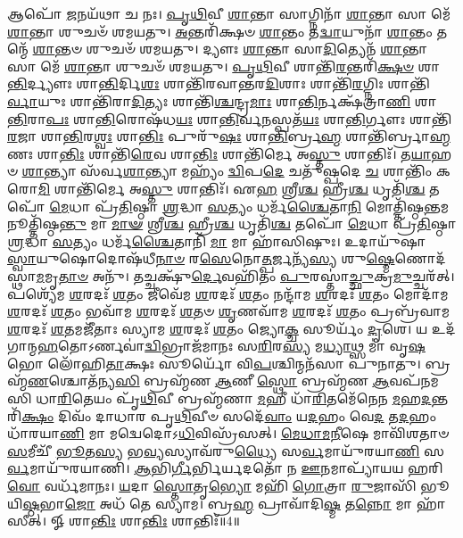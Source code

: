 𑌆𑌪𑍋᳴ \ul{𑌜}\-𑌨𑌯᳴𑌥𑌾 𑌚 𑌨𑌃। \ul{𑌪𑍃}\-\-\ul{𑌥𑌿}\-𑌵𑍀 \ul{𑌶𑌾}\-𑌨𑍍𑌤𑌾 𑌸𑌾𑌗𑍍𑌨𑌿𑌨𑌾᳴ \ul{𑌶𑌾}\-𑌨𑍍𑌤𑌾 𑌸𑌾 𑌮𑍇᳴ \ul{𑌶𑌾}\-𑌨𑍍𑌤𑌾 𑌶𑍁𑌚𑍞᳴ 𑌶𑌮𑌯𑌤𑍁। \ul{𑌅}\-𑌨𑍍𑌤𑌰𑌿᳴𑌕𑍍𑌷𑍞 \ul{𑌶𑌾}\-𑌨𑍍𑌤𑌂 𑌤\-\ul{𑌦𑍍𑌵𑌾}\-𑌯𑍁𑌨𑌾᳴ \ul{𑌶𑌾}\-𑌨𑍍𑌤𑌂 𑌤𑌨𑍍𑌮𑍇᳴ \ul{𑌶𑌾}\-𑌨𑍍𑌤𑍞 𑌶𑍁𑌚𑍞᳴ 𑌶𑌮𑌯𑌤𑍁। 𑌦𑍍𑌯𑍗𑌃  \ul{𑌶𑌾}\-𑌨𑍍𑌤𑌾 𑌸𑌾\-\ul{𑌦𑌿}\-𑌤𑍍𑌯𑍇𑌨᳴ \ul{𑌶𑌾}\-𑌨𑍍𑌤𑌾 𑌸𑌾 𑌮𑍇᳴ \ul{𑌶𑌾}\-𑌨𑍍𑌤𑌾 𑌶𑍁𑌚𑍞᳴ 𑌶𑌮𑌯𑌤𑍁। \ul{𑌪𑍃}\-\-\ul{𑌥𑌿}\-𑌵𑍀 𑌶𑌾𑌨𑍍𑌤𑌿᳴\-\ul{𑌰}\-𑌨𑍍𑌤𑌰𑌿᳴\-\ul{𑌕𑍍𑌷}\-\-\ul{𑍞} 𑌶𑌾\-\ul{𑌨𑍍𑌤𑌿}\-𑌰𑍍𑌦𑍍𑌯𑍗𑌃  𑌶𑌾\-\ul{𑌨𑍍𑌤𑌿}\-𑌰𑍍𑌦𑌿\-\ul{𑌶𑌃} 𑌶𑌾𑌨𑍍𑌤𑌿᳴𑌰𑌵𑌾𑌨𑍍𑌤𑌰\-\ul{𑌦𑌿}\-𑌶𑌾𑌃  𑌶𑌾𑌨𑍍𑌤𑌿᳴\-\ul{𑌰}\-𑌗𑍍𑌨𑌿𑌃  𑌶𑌾𑌨𑍍𑌤𑌿᳴\-\ul{𑌰𑍍𑌵𑌾}\-𑌯𑍁𑌃  𑌶𑌾𑌨𑍍𑌤𑌿᳴𑌰𑌾\-\ul{𑌦𑌿}\-𑌤𑍍𑌯𑌃  𑌶𑌾𑌨𑍍𑌤𑌿᳴\-\ul{𑌶𑍍𑌚}\-𑌨𑍍𑌦𑍍𑌰\-\ul{𑌮𑌾𑌃} 𑌶𑌾\-\ul{𑌨𑍍𑌤𑌿}\-𑌰𑍍𑌨𑌕𑍍𑌷᳴𑌤𑍍𑌰𑌾\-\ul{𑌣𑌿} 𑌶𑌾\-\ul{𑌨𑍍𑌤𑌿}\-𑌰𑌾\-\ul{𑌪𑌃} 𑌶𑌾\-\ul{𑌨𑍍𑌤𑌿}\-𑌰𑍋𑌷᳴𑌧\-\ul{𑌯𑌃} 𑌶𑌾\-\ul{𑌨𑍍𑌤𑌿}\-𑌰𑍍𑌵\-\ul{𑌨}\-𑌸𑍍𑌪𑌤᳴\-\ul{𑌯𑌃} 𑌶𑌾\-\ul{𑌨𑍍𑌤𑌿}\-𑌰𑍍𑌗𑍗𑌃  𑌶𑌾𑌨𑍍𑌤𑌿᳴\-\ul{𑌰}\-𑌜𑌾 𑌶𑌾\-\ul{𑌨𑍍𑌤𑌿}\-𑌰\-\ul{𑌶𑍍𑌵𑌃} 𑌶𑌾\-\ul{𑌨𑍍𑌤𑌿𑌃} 𑌪𑍁𑌰𑍁᳴\-\ul{𑌷𑌃} 𑌶𑌾\-\ul{𑌨𑍍𑌤𑌿}\-𑌰𑍍𑌬𑍍𑌰\-\ul{𑌹𑍍𑌮} 𑌶𑌾𑌨𑍍𑌤𑌿᳴𑌰𑍍𑌬𑍍𑌰𑌾\-\ul{𑌹𑍍𑌮}\-𑌣𑌃  𑌶𑌾\-\ul{𑌨𑍍𑌤𑌿𑌃} 𑌶𑌾𑌨𑍍𑌤𑌿᳴\-\ul{𑌰𑍇}\-𑌵 𑌶𑌾\-\ul{𑌨𑍍𑌤𑌿𑌃} 𑌶𑌾𑌨𑍍𑌤𑌿᳴𑌰𑍍𑌮𑍇 𑌅\-\ul{𑌸𑍍𑌤𑍁} 𑌶𑌾𑌨𑍍𑌤𑌿𑌃᳴। 𑌤\-\ul{𑌯𑌾}\-𑌹𑍞 \ul{𑌶𑌾}\-𑌨𑍍𑌤𑍍𑌯𑌾 𑌸᳴𑌰𑍍𑌵\-\ul{𑌶𑌾}\-𑌨𑍍𑌤𑍍𑌯𑌾 𑌮𑌹𑍍𑌯𑌂᳴ \ul{𑌦𑍍𑌵𑌿}\-𑌪\-\ul{𑌦𑍇} 𑌚𑌤𑍁᳴𑌷𑍍𑌪𑌦𑍇 \ul{𑌚} 𑌶𑌾𑌨𑍍𑌤𑌿𑌂᳴ 𑌕𑌰𑍋\-\ul{𑌮𑌿} 𑌶𑌾𑌨𑍍𑌤𑌿᳴𑌰𑍍𑌮𑍇 𑌅\-\ul{𑌸𑍍𑌤𑍁} 𑌶𑌾𑌨𑍍𑌤𑌿𑌃᳴। 𑌏\-\ul{𑌹} 𑌶𑍍𑌰𑍀\-\ul{𑌶𑍍𑌚} 𑌹𑍍𑌰𑍀\-\ul{𑌶𑍍𑌚} 𑌧𑍃𑌤𑌿᳴\-\ul{𑌶𑍍𑌚} 𑌤𑌪𑍋᳴ \ul{𑌮𑍇}\-𑌧𑌾 𑌪𑍍𑌰᳴\-\ul{𑌤𑌿}\-𑌷𑍍𑌠𑌾 \ul{𑌶𑍍𑌰}\-𑌦𑍍𑌧𑌾 \ul{𑌸}\-𑌤𑍍𑌯𑌂 𑌧𑌰𑍍𑌮᳴\-\ul{𑌶𑍍𑌚𑍈}\-𑌤𑌾\-\ul{𑌨𑌿} 𑌮𑍋𑌤𑍍𑌤𑌿᳴𑌷𑍍𑌠\-\ul{𑌨𑍍𑌤}\-𑌮𑌨𑍂𑌤𑍍𑌤𑌿᳴𑌷𑍍𑌠\-\ul{𑌨𑍍𑌤𑍁} 𑌮𑌾 \ul{𑌮𑌾}\-\-\ul{𑍟} 𑌶𑍍𑌰𑍀\-\ul{𑌶𑍍𑌚} 𑌹𑍍𑌰𑍀\-\ul{𑌶𑍍𑌚} 𑌧𑍃𑌤𑌿᳴\-\ul{𑌶𑍍𑌚} 𑌤𑌪𑍋᳴ \ul{𑌮𑍇}\-𑌧𑌾 𑌪𑍍𑌰᳴\-\ul{𑌤𑌿}\-𑌷𑍍𑌠𑌾 \ul{𑌶𑍍𑌰}\-𑌦𑍍𑌧𑌾 \ul{𑌸}\-𑌤𑍍𑌯𑌂 𑌧𑌰𑍍𑌮᳴\-\ul{𑌶𑍍𑌚𑍈}\-𑌤𑌾𑌨𑌿᳴ \ul{𑌮𑌾} 𑌮𑌾 𑌹𑌾᳴𑌸𑌿𑌷𑍁𑌃। 𑌉𑌦𑌾𑌯𑍁᳴𑌷𑌾 \ul{𑌸𑍍𑌵𑌾}\-𑌯𑍁𑌷𑍋𑌦𑍋𑌷᳴𑌧𑍀\-\ul{𑌨𑌾}\-\-\ul{𑍞} 𑌰\-\ul{𑌸𑍇}\-𑌨𑍋\-\ul{𑌤𑍍𑌪}\-𑌰𑍍𑌜𑌨𑍍𑌯᳴\-\ul{𑌸𑍍𑌯} 𑌶𑍁\-\ul{𑌷𑍍𑌮𑍇}\-𑌣𑍋𑌦᳴𑌸𑍍𑌥𑌾\-\ul{𑌮}\-𑌮𑍃\-\ul{𑌤𑌾}\-\-\ul{𑍞} 𑌅𑌨𑍁᳴। 𑌤𑌚𑍍𑌚𑌕𑍍𑌷𑍁᳴\-\ul{𑌰𑍍𑌦𑍇}\-𑌵𑌹𑌿᳴𑌤𑌂 \ul{𑌪𑍁}\-𑌰𑌸𑍍𑌤𑌾॑\-\ul{𑌚𑍍𑌛𑍁}\-𑌕𑍍𑌰\-\ul{𑌮𑍁}\-𑌚𑍍𑌚𑌰᳴𑌤𑍍। 𑌪𑌶𑍍𑌯𑍇᳴𑌮 \ul{𑌶}\-𑌰𑌦𑌃᳴ \ul{𑌶}\-𑌤𑌂 𑌜𑍀𑌵𑍇᳴𑌮 \ul{𑌶}\-𑌰𑌦𑌃᳴ \ul{𑌶}\-𑌤𑌂 𑌨𑌨𑍍𑌦𑌾᳴𑌮 \ul{𑌶}\-𑌰𑌦𑌃᳴ \ul{𑌶}\-𑌤𑌂 𑌮𑍋𑌦𑌾᳴𑌮 \ul{𑌶}\-𑌰𑌦𑌃᳴ \ul{𑌶}\-𑌤𑌂 𑌭𑌵𑌾᳴𑌮 \ul{𑌶}\-𑌰𑌦𑌃᳴ \ul{𑌶}\-𑌤𑍞 \ul{𑌶𑍃}\-𑌣𑌵𑌾᳴𑌮 \ul{𑌶}\-𑌰𑌦𑌃᳴ \ul{𑌶}\-𑌤𑌂 𑌪𑍍𑌰𑌬𑍍𑌰᳴𑌵𑌾𑌮 \ul{𑌶}\-𑌰𑌦𑌃᳴ \ul{𑌶}\-𑌤𑌮𑌜𑍀᳴𑌤𑌾𑌃 𑌸𑍍𑌯𑌾𑌮 \ul{𑌶}\-𑌰𑌦𑌃᳴ \ul{𑌶}\-𑌤𑌂 𑌜𑍍𑌯𑍋\-\ul{𑌕𑍍𑌚} 𑌸𑍂𑌰𑍍𑌯𑌂᳴ \ul{𑌦𑍃}\-𑌶𑍇। 𑌯 𑌉𑌦᳴𑌗𑌾𑌨𑍍𑌮\-\ul{𑌹}\-𑌤𑍋𑌽𑌰𑍍𑌣𑌵𑌾॑\-\ul{𑌦𑍍𑌵𑌿}\-𑌭𑍍𑌰𑌾𑌜᳴𑌮𑌾𑌨𑌃 𑌸\-\ul{𑌰𑌿}\-𑌰\-\ul{𑌸𑍍𑌯} 𑌮\-\ul{𑌧𑍍𑌯𑌾}\-𑌥𑍍𑌸 𑌮𑌾॑ 𑌵𑍃\-\ul{𑌷}\-𑌭𑍋 𑌲𑍋᳴𑌹𑌿\-\ul{𑌤𑌾}\-𑌕𑍍𑌷𑌃 𑌸𑍂𑌰𑍍𑌯𑍋᳴ 𑌵𑌿\-\ul{𑌪}\-𑌶𑍍𑌚𑌿𑌨𑍍𑌮𑌨᳴𑌸𑌾 𑌪𑍁𑌨𑌾𑌤𑍁। 𑌬𑍍𑌰𑌹𑍍𑌮᳴\-\ul{𑌣}\-𑌶𑍍𑌚𑍋𑌤᳴𑌨𑍍𑌯\-\ul{𑌸𑌿} 𑌬𑍍𑌰𑌹𑍍𑌮᳴𑌣 \ul{𑌆}\-𑌣𑍀 \ul{𑌸𑍍𑌥𑍋} 𑌬𑍍𑌰𑌹𑍍𑌮᳴𑌣 \ul{𑌆}\-𑌵𑌪᳴𑌨𑌮𑌸𑌿 𑌧𑌾\-\ul{𑌰𑌿}\-𑌤𑍇𑌯𑌂 𑌪𑍃᳴\-\ul{𑌥𑌿}\-𑌵𑍀 𑌬𑍍𑌰𑌹𑍍𑌮᳴𑌣𑌾 \ul{𑌮}\-𑌹𑍀 𑌧𑌾᳴\-\ul{𑌰𑌿}\-𑌤𑌮𑍇᳴𑌨𑍇𑌨 \ul{𑌮}\-𑌹\-\ul{𑌦}\-𑌨𑍍𑌤𑌰𑌿᳴\-\ul{𑌕𑍍𑌷𑌂} 𑌦𑌿𑌵𑌂᳴ 𑌦𑌾𑌧𑌾𑌰 𑌪𑍃\-\ul{𑌥𑌿}\-𑌵𑍀𑍞 𑌸𑌦𑍇᳴\-\ul{𑌵𑌾𑌂} 𑌯\-\ul{𑌦}\-𑌹𑌂 𑌵𑍇\-\ul{𑌦} 𑌤\-\ul{𑌦}\-𑌹𑌂 𑌧𑌾᳴𑌰𑌯𑌾\-\ul{𑌣𑌿} 𑌮𑌾 𑌮𑌦𑍍𑌵𑍇𑌦𑍋𑌽\-\ul{𑌧𑌿}\-𑌵𑌿𑌸𑍍𑌰᳴𑌸𑌤𑍍। \ul{𑌮𑍇}\-\-\ul{𑌧𑌾}\-\-\ul{𑌮}\-\-\ul{𑌨𑍀}\-𑌷𑍇 𑌮𑌾𑌵𑌿᳴𑌶𑌤𑌾𑍞 \ul{𑌸}\-𑌮𑍀𑌚𑍀᳴ \ul{𑌭𑍂}\-𑌤\-\ul{𑌸𑍍𑌯} 𑌭\-\ul{𑌵𑍍𑌯}\-𑌸𑍍𑌯𑌾𑌵᳴𑌰𑍁\-\ul{𑌧𑍍𑌯𑍈} 𑌸\-\ul{𑌰𑍍𑌵}\-𑌮𑌾𑌯𑍁᳴𑌰𑌯𑌾\-\ul{𑌣𑌿} 𑌸\-\ul{𑌰𑍍𑌵}\-𑌮𑌾𑌯𑍁᳴𑌰𑌯𑌾𑌣𑌿। \ul{𑌆}\-𑌭𑌿\-\ul{𑌰𑍍𑌗𑍀}\-𑌰𑍍𑌭𑌿𑌰𑍍𑌯𑌦𑌤𑍋᳴ 𑌨 \ul{𑌊}\-𑌨𑌮𑌾𑌪𑍍𑌯𑌾᳴𑌯𑌯 𑌹𑌰𑌿\-\ul{𑌵𑍋} 𑌵𑌰𑍍𑌧᳴𑌮𑌾𑌨𑌃। \ul{𑌯}\-𑌦𑌾 \ul{𑌸𑍍𑌤𑍋}\-𑌤𑍃\-\ul{𑌭𑍍𑌯𑍋} 𑌮𑌹𑌿᳴ \ul{𑌗𑍋}\-𑌤𑍍𑌰𑌾 \ul{𑌰𑍁}\-𑌜𑌾𑌸𑌿᳴ 𑌭𑍂𑌯𑌿\-\ul{𑌷𑍍𑌠}\-𑌭𑌾\-\ul{𑌜𑍋} 𑌅𑌧᳴ 𑌤𑍇 𑌸𑍍𑌯𑌾𑌮। 𑌬𑍍𑌰\-\ul{𑌹𑍍𑌮} 𑌪𑍍𑌰𑌾𑌵𑌾᳴𑌦𑌿\-\ul{𑌷𑍍𑌮} 𑌤\-\ul{𑌨𑍍𑌨𑍋} 𑌮𑌾 𑌹𑌾᳴𑌸𑍀𑌤𑍍। 𑍐 𑌶𑌾\-\ul{𑌨𑍍𑌤𑌿𑌃} 𑌶𑌾\-\ul{𑌨𑍍𑌤𑌿𑌃} 𑌶𑌾𑌨𑍍𑌤𑌿𑌃᳴॥4॥

